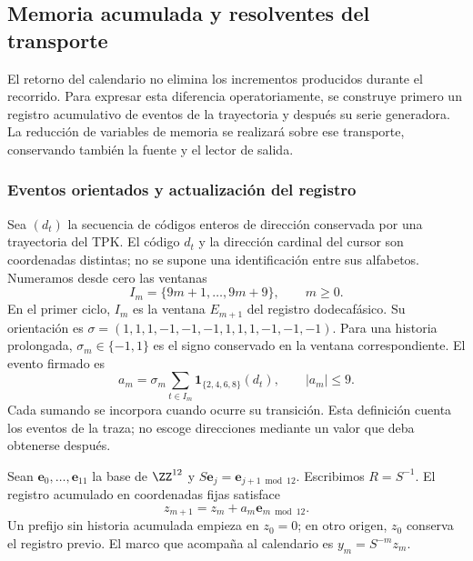 \subsection{Memoria acumulada y resolventes del transporte}
\label{subsec:memoria-resolvente}

El retorno del calendario no elimina los incrementos producidos durante
el recorrido. Para expresar esta diferencia operatoriamente, se construye
primero un registro acumulativo de eventos de la trayectoria y después su
serie generadora. La reducción de variables de memoria se realizará sobre
ese transporte, conservando también la fuente y el lector de salida.

\subsubsection{Eventos orientados y actualización del registro}

Sea \((d_t)\) la secuencia de códigos enteros de dirección conservada
por una trayectoria del TPK. El código \(d_t\) y la dirección cardinal
del cursor son coordenadas distintas; no se supone una identificación
entre sus alfabetos. Numeramos desde cero las ventanas
\[
 I_m=\{9m+1,\ldots,9m+9\},\qquad m\geq0.
\]
En el primer ciclo, \(I_m\) es la ventana \(E_{m+1}\) del registro
dodecafásico. Su orientación es
\(\sigma=(1,1,1,-1,-1,-1,1,1,1,-1,-1,-1)\).
Para una historia prolongada, \(\sigma_m\in\{-1,1\}\) es el signo
conservado en la ventana correspondiente. El evento firmado es
\begin{equation}
 a_m=\sigma_m\sum_{t\in I_m}
       \mathbf1_{\{2,4,6,8\}}(d_t),\qquad |a_m|\leq9.
 \label{mem:evento}
\end{equation}
Cada sumando se incorpora cuando ocurre su transición. Esta definición
cuenta los eventos de la traza; no escoge direcciones mediante un valor
que deba obtenerse después.

Sean \(\mathbf e_0,\ldots,\mathbf e_{11}\) la base de \(\ZZ^{12}\)
y \(S\mathbf e_j=\mathbf e_{j+1\bmod12}\). Escribimos
\(R=S^{-1}\). El registro acumulado en coordenadas fijas satisface
\[
z_{m+1}=z_m+a_m\mathbf e_{m\bmod12}.
\]
Un prefijo sin historia acumulada empieza en \(z_0=0\); en otro
origen, \(z_0\) conserva el registro previo.
El marco que acompaña al calendario es \(y_m=S^{-m}z_m\).

